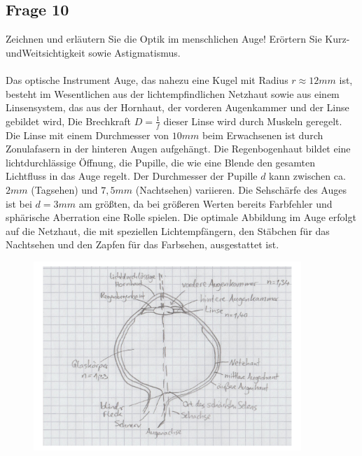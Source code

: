 \documentclass[a4paper,10pt]{scrartcl}
\begin{document}
	\subsection{Frage 10}
		Zeichnen und erläutern Sie die Optik im menschlichen Auge! Erörtern Sie Kurz- undWeitsichtigkeit sowie Astigmatismus.
		\\
		\\
		Das optische Instrument Auge, das nahezu eine Kugel mit Radius $r\approx12 mm$ ist, besteht im Wesentlichen aus der lichtempfindlichen Netzhaut sowie aus einem Linsensystem, das aus der Hornhaut, der vorderen Augenkammer und der Linse gebildet wird, Die Brechkraft $D=\frac{1}{f}$ dieser Linse wird durch Muskeln geregelt. Die Linse mit einem Durchmesser von $10 mm$ beim Erwachsenen ist durch Zonulafasern in der hinteren Augen aufgehängt. Die Regenbogenhaut bildet eine lichtdurchlässige Öffnung, die Pupille, die wie eine Blende den gesamten Lichtfluss in das Auge regelt. Der Durchmesser der Pupille $d$ kann zwischen ca. $2 mm$ (Tagsehen) und $7,5 mm$ (Nachtsehen) variieren. Die Sehschärfe des Auges ist bei $d=3 mm$ am größten, da bei größeren Werten bereits Farbfehler und sphärische Aberration eine Rolle spielen. Die optimale Abbildung im Auge erfolgt auf die Netzhaut, die mit speziellen Lichtempfängern, den Stäbchen für das Nachtsehen und den Zapfen für das Farbsehen, ausgestattet ist.
		
			\begin{center}
				\begin{figure}[h]
\centering
\includegraphics[width=0.9\textwidth]{./Bilder/og13}
\end{figure}
\FloatBarrier
			\end{center}
	
\end{document}
